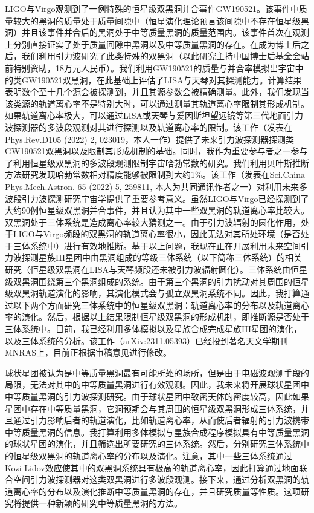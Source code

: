 \documentclass[12pt,a4paper,sans]{article}%
\begin{document}
\begin{CJK}{UTF8}{gbsn}
LIGO与Virgo观测到了一例特殊的恒星级双黑洞并合事件GW190521。该事件中质量较大的黑洞的质量处于质量间隙中（恒星演化理论预言该间隙中不存在恒星级黑洞）并且该事件并合后的黑洞处于中等质量黑洞的质量范围内。该事件首次在观测上分别直接证实了处于质量间隙中黑洞以及中等质量黑洞的存在。在成为博士后之后，我们利用引力波研究了此类特殊的双黑洞（以此研究主持中国博士后基金会站前特别资助，18万元人民币）。我们利用GW190521的质量与并合率模拟出宇宙中的类GW190521双黑洞，在此基础上评估了LISA与天琴对其探测能力。计算结果表明数个至十几个源会被探测到，并且其源参数会被精确测量。此外，我们发现当该类源的轨道离心率不是特别大时，可以通过测量其轨道离心率限制其形成机制。如果轨道离心率极大，可以通过LISA或天琴与爱因斯坦望远镜等第三代地面引力波探测器的多波段观测对其进行探测以及轨道离心率的限制。该工作（发表在Phys.Rev.D105 (2022) 2, 023019，本人一作）提供了未来引力波探测器探测类GW190521双黑洞以及限制其形成机制的基础。同时，我作为重要参与者之一参与了利用恒星级双黑洞的多波段观测限制宇宙哈勃常数的研究。我们利用贝叶斯推断方法研究发现哈勃常数相对精度能够被限制到大约1\%。该工作（发表在Sci.China Phys.Mech.Astron. 65 (2022) 5, 259811, 本人为共同通讯作者之一）对利用未来多波段引力波探测研究宇宙学提供了重要参考意义。虽然LIGO与Virgo已经探测到了大约90例恒星级双黑洞并合事件，并且认为其中一些双黑洞的轨道离心率比较大。双黑洞处于三体系统是造成离心率较大猜测之一。由于引力波辐射的圆化作用，处于LIGO与Virgo频段的双黑洞的轨道离心率很小，因此无法对其所处环境（是否处于三体系统中）进行有效地推断。基于以上问题，我现在正在开展利用未来空间引力波探测星族III星团中由黑洞组成的等级三体系统（以下简称三体系统）的相关研究（恒星级双黑洞在LISA与天琴频段还未被引力波辐射圆化）。三体系统由恒星级双黑洞围绕第三个黑洞组成的系统。由于第三个黑洞的引力扰动对其周围的恒星级双黑洞轨道演化的影响，其演化模式会与孤立双黑洞系统不同。因此，我打算通过以下两个方面研究三体系统中的恒星级双黑洞：轨道离心率的分布以及轨道离心率的演化。然后，根据以上结果限制恒星级双黑洞的形成机制，即推断源是否处于三体系统中。目前，我已经利用多体模拟以及星族合成完成星族III星团的演化，以及三体系统的分析。该工作（arXiv:2311.05393）已经投到著名天文学期刊MNRAS上，目前正根据审稿意见进行修改。

球状星团被认为是中等质量黑洞最有可能所处的场所，但是由于电磁波观测手段的局限，无法对其中的中等质量黑洞进行有效观测。因此，我未来将开展球状星团中中等质量黑洞的引力波探测研究。由于球状星团中致密天体的密度较高，因此如果星团中存在中等质量黑洞，它洞预期会与其周围的恒星级双黑洞形成三体系统，并且通过引力影响后者的轨道演化，比如轨道离心率，从而使后者辐射的引力波携带中等质量黑洞的信息。我打算利用多体模拟与星族合成程序模拟具有中等质量黑洞的球状星团的演化，并且筛选出所要研究的三体系统。然后，分别研究三体系统中的恒星级双黑洞的轨道离心率的分布以及演化。注意，其中一些三体系统通过Kozi-Lidov效应使其中的双黑洞系统具有极高的轨道离心率，因此打算通过地面联合空间引力波探测器对这类双黑洞进行多波段观测。接下来，通过分析双黑洞的轨道离心率的分布以及演化推断中等质量黑洞的存在，并且研究质量等性质。这项研究将提供一种新颖的研究中等质量黑洞的方法。


\end{CJK}
\end{document}
